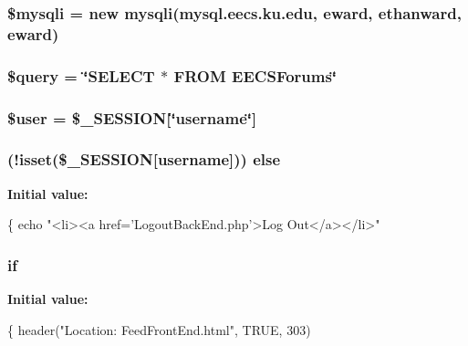 \subsubsection[{\texorpdfstring{\$mysqli}{$mysqli}}]{\setlength{\rightskip}{0pt plus 5cm}\$mysqli = new mysqli(\textquotesingle{}mysql.\+eecs.\+ku.\+edu\textquotesingle{}, \textquotesingle{}eward\textquotesingle{}, \textquotesingle{}ethanward\textquotesingle{}, \textquotesingle{}eward\textquotesingle{})}\hypertarget{_display_links_8php_a580989e8e3521433691a0351287f6315}{}\label{_display_links_8php_a580989e8e3521433691a0351287f6315}
\subsubsection[{\texorpdfstring{\$query}{$query}}]{\setlength{\rightskip}{0pt plus 5cm}\$query = \char`\"{}S\+E\+L\+E\+CT $\ast$ F\+R\+OM E\+E\+C\+S\+Forums\char`\"{}}\hypertarget{_display_links_8php_af59a5f7cd609e592c41dc3643efd3c98}{}\label{_display_links_8php_af59a5f7cd609e592c41dc3643efd3c98}
\subsubsection[{\texorpdfstring{\$user}{$user}}]{\setlength{\rightskip}{0pt plus 5cm}\$user = \$\+\_\+\+S\+E\+S\+S\+I\+ON\mbox{[}\char`\"{}username\char`\"{}\mbox{]}}\hypertarget{_display_links_8php_a598ca4e71b15a1313ec95f0df1027ca5}{}\label{_display_links_8php_a598ca4e71b15a1313ec95f0df1027ca5}
\subsubsection[{\texorpdfstring{else}{else}}]{ (!isset(\$\+\_\+\+S\+E\+S\+S\+I\+ON\mbox{[}\textquotesingle{}username\textquotesingle{}\mbox{]})) else}\hypertarget{_display_links_8php_a8691f3cba8478e398368302e5f0cb89b}{}\label{_display_links_8php_a8691f3cba8478e398368302e5f0cb89b}
{\bfseries Initial value\+:}
\begin{DoxyCode}
\{
  echo \textcolor{stringliteral}{"<li><a href='LogoutBackEnd.php'>Log Out</a></li>"}
\end{DoxyCode}
\subsubsection[{\texorpdfstring{if}{if}}]{\setlength{\rightskip}{0pt plus 5cm}if}\hypertarget{_display_links_8php_aba19ca87a8222f9588fd377feafe258e}{}\label{_display_links_8php_aba19ca87a8222f9588fd377feafe258e}
{\bfseries Initial value\+:}
\begin{DoxyCode}
\{
  header(\textcolor{stringliteral}{"Location: FeedFrontEnd.html"}, TRUE, 303)
\end{DoxyCode}
